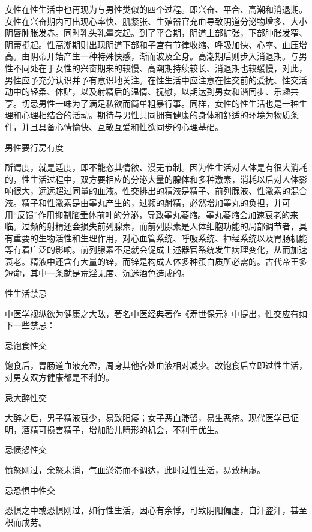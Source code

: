\documentclass[12pt,UTF8,openany]{ctexbook}
\begin{document}
女性在性生活中也再现为与男性类似的四个过程。即兴奋、平合、高潮和消退期。女性在兴奋期内可出现心率快、肌紧张、生殖器官充血导致阴道分泌物增多、大小阴唇肿胀发赤。同时乳头乳晕突起。到了平合期，阴道上部扩张，下部肿胀发窄、阴蒂挺起。性高潮期则出现阴道下部和子宫有节律收缩、呼吸加快、心率、血压增高。由阴蒂开始产生一种特殊快感，渐而波及全身。高潮期后则步入消退期。与男性不同处在于女性的兴奋期来的较慢、高潮期持续较长、消退期也较缓慢，对此，男性应予充分认识并予有意识地关注。在性生活中应注意在性交前的爱抚、性交活动中的轻柔、体贴，以及射精后的温情、抚慰，以期达到男女和谐同步、乐趣共享。切忌男性一味为了满足私欲而简单粗暴行事。同样，女性的性生活也是一种生理和心理相结合的活动。期待与男性共同拥有健康的身体和舒适的环境为物质条件，并且具备心情愉快、互敬互爱和性欲同步的心理基础。





男性要行房有度


所谓度，就是适度，即不能恣其情欲、漫无节制。因为性生活对人体是有很大消耗的，性生活过程中，双方要相应的分泌大量的腺体和多种激素，消耗以后对人体影响很大，远远超过同量的血液。性交排出的精液是精子、前列腺液、性激素的混合液。精子和性激素是由睾丸产生的，过频的射精，必然增加睾丸的负担，并可用“反馈”作用抑制脑垂体前叶的分泌，导致睾丸萎缩。睾丸萎缩会加速衰老的来临。过频的射精还会损失前列腺素，而前列腺素是人体细胞功能的局部调节者，具有重要的生物活性和生理作用，对心血管系统、呼吸系统、神经系统以及胃肠机能等有着广泛的影响。前列腺素不足就会促成上述器官系统发生病理变化，从而加速衰老。精液中还含有大量的锌，而锌是构成人体多种蛋白质所必需的。古代帝王多短命，其中一条就是荒淫无度、沉迷酒色造成的。





性生活禁忌


中医学视纵欲为健康之大敌，著名中医经典著作《寿世保元》中提出，性交应有如下一些禁忌：

忌饱食性交

饱食后，胃肠道血液充盈，周身其他各处血液相对减少。故饱食后立即过性生活，对男女双方健康都是不利的。

忌大醉性交

大醉之后，男子精液衰少，易致阳痿；女子恶血滞留，易生恶疮。现代医学已证明，酒精可损害精子，增加胎儿畸形的机会，不利于优生。

忌愤怒性交

愤怒刚过，余怒未消，气血淤滞而不调达，此时过性生活，易致精虚。

忌恐惧中性交

恐惧之中或恐惧刚过，如行性生活，因心有余悸，可致阴阳偏虚，自汗盗汗，甚至积而成劳。
\end{document}
